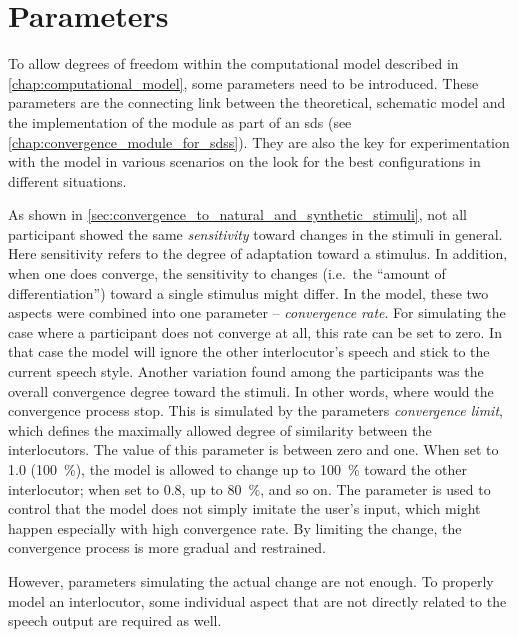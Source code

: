 \section{Parameters}
\label{sec:parameters}

To allow degrees of freedom within the computational model described in \cref{chap:computational_model}, some parameters need to be introduced.
These parameters are the connecting link between the theoretical, schematic model and the implementation of the module as part of an \acs{sds} (see \cref{chap:convergence_module_for_sdss}).
They are also the key for experimentation with the model in various scenarios on the look for the best configurations in different situations.

As shown in \cref{sec:convergence_to_natural_and_synthetic_stimuli}, not all participant showed the same \textit{sensitivity} toward changes in the stimuli in general.
Here sensitivity refers to the degree of adaptation toward a stimulus.
In addition, when one does converge, the sensitivity to changes (i.e.~the \enquote{amount of differentiation}) toward a single stimulus might differ.
In the model, these two aspects were combined into one parameter -- \textit{convergence rate}.
For simulating the case where a participant does not converge at all, this rate can be set to zero.
In that case the model will ignore the other interlocutor's speech and stick to the current speech style.
Another variation found among the participants was the overall convergence degree toward the stimuli.
In other words, where would the convergence process stop.
This is simulated by the parameters \textit{convergence limit}, which defines the maximally allowed degree of similarity between the interlocutors.
The value of this parameter is between zero and one.
When set to 1.0 (\SI{100}{\percent}), the model is allowed to change up to \SI{100}{\percent} toward the other interlocutor; when set to 0.8, up to \SI{80}{\percent}, and so on.
The parameter is used to control that the model does not simply imitate the user's input, which might happen especially with high convergence rate.
By limiting the change, the convergence process is more gradual and restrained.

However, parameters simulating the actual change are not enough.
To properly model an interlocutor, some individual aspect that are not directly related to the speech output are required as well.

